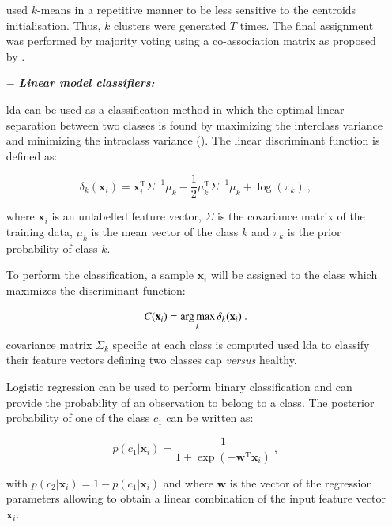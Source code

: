 \begin{enumerate}[leftmargin=*]
\cite{Tiwari2008,Viswanath2008,Viswanath2008a} used $k$-means in a repetitive manner to be less sensitive to the centroids initialisation. Thus, $k$ clusters were generated $T$ times. The final assignment was performed by majority voting using a co-association matrix as proposed by \cite{Fred2005}.

\item[$-$] \textbf{\textit{Linear model classifiers:}} 

\Acf{lda} can be used as a classification method in which the optimal linear separation between two classes is found by maximizing the interclass variance and minimizing the intraclass variance (\cite{Friedman1989}). The linear discriminant function is defined as:

\begin{equation}
	\delta_{k}(\mathbf{x}_i) = \mathbf{x}_i^{\text{T}} \Sigma^{-1} \mu_k - \frac{1}{2} \mu_{k}^{\text{T}} \Sigma^{-1} \mu_k + \log (\pi_k) \ ,
	\label{eq:ldafun}
\end{equation}

\noindent where $\mathbf{x}_i$ is an unlabelled feature vector, $\Sigma$ is the covariance matrix of the training data, $\mu_k$ is the mean vector of the class $k$ and $\pi_k$ is the prior probability of class $k$.

To perform the classification, a sample $\mathbf{x}_i$ will be assigned to the class which maximizes the discriminant function:

\begin{equation}
	C(\mathbf{x}_i) = \operatorname*{arg\,max}_k \delta_k(\mathbf{x}_i) \ .
	\label{eq:ldaclass}
\end{equation}
covariance matrix $\Sigma_k$ specific at each class is computed
\cite{Antic2013,Chan2003,Niaf2011,Niaf2012,Vos2012} used \ac{lda} to classify their feature vectors defining two classes \ac{cap} \textit{versus} healthy.

Logistic regression can be used to perform binary classification and can provide the probability of an observation to belong to a class. The posterior probability of one of the class $c_1$ can be written as:

\begin{equation}
	p(c_1|\mathbf{x}_i) = \frac{1}{1+\exp(-\mathbf{w}^{\text{T}}\mathbf{x}_i)} \ ,
	\label{eq:postprlr}
\end{equation}

\noindent with $p(c_2|\mathbf{x}_i) = 1 - p(c_1|\mathbf{x}_i)$ and where $\mathbf{w}$ is the vector of the regression parameters allowing to obtain a linear combination of the input feature vector $\mathbf{x}_i$.


\end{enumerate}
